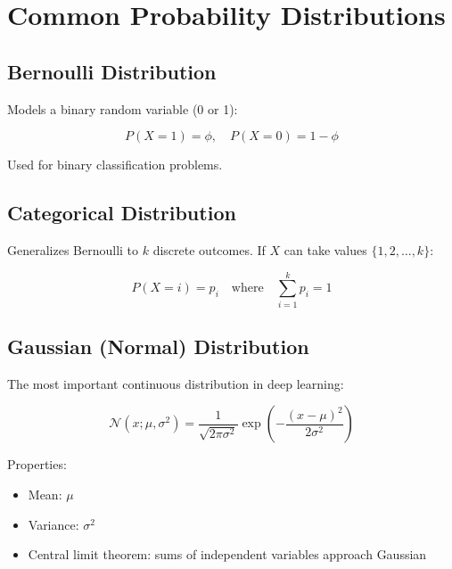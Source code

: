 
\section{Common Probability Distributions}
\label{sec:common-distributions}

\subsection{Bernoulli Distribution}

Models a binary random variable (0 or 1):

\begin{equation}
P(X=1) = \phi, \quad P(X=0) = 1-\phi
\end{equation}

Used for binary classification problems.

\subsection{Categorical Distribution}

Generalizes Bernoulli to $k$ discrete outcomes. If $X$ can take values $\{1, 2, \ldots, k\}$:

\begin{equation}
P(X=i) = p_i \quad \text{where} \quad \sum_{i=1}^{k} p_i = 1
\end{equation}

\subsection{Gaussian (Normal) Distribution}

The most important continuous distribution in deep learning:

\begin{equation}
\mathcal{N}(x; \mu, \sigma^2) = \frac{1}{\sqrt{2\pi\sigma^2}} \exp\left(-\frac{(x-\mu)^2}{2\sigma^2}\right)
\end{equation}

Properties:
\begin{itemize}
    \item Mean: $\mu$
    \item Variance: $\sigma^2$
    \item Central limit theorem: sums of independent variables approach Gaussian
\end{itemize}

